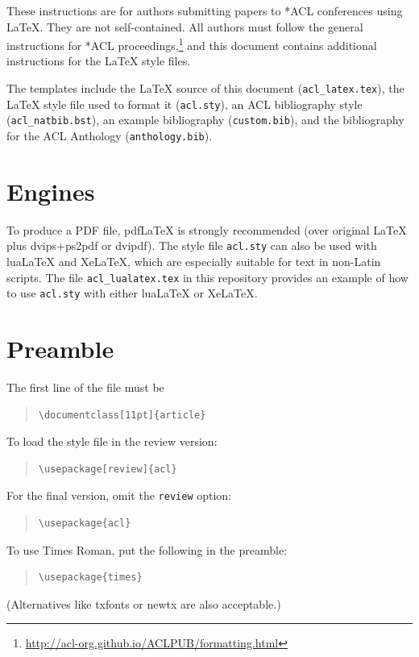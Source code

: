 \documentclass[11pt]{article}
\begin{document}
These instructions are for authors submitting papers to *ACL conferences using \LaTeX. They are not self-contained. All authors must follow the general instructions for *ACL proceedings,\footnote{\url{http://acl-org.github.io/ACLPUB/formatting.html}} and this document contains additional instructions for the \LaTeX{} style files.

The templates include the \LaTeX{} source of this document (\texttt{acl\_latex.tex}),
the \LaTeX{} style file used to format it (\texttt{acl.sty}),
an ACL bibliography style (\texttt{acl\_natbib.bst}),
an example bibliography (\texttt{custom.bib}),
and the bibliography for the ACL Anthology (\texttt{anthology.bib}).

\section{Engines}

To produce a PDF file, pdf\LaTeX{} is strongly recommended (over original \LaTeX{} plus dvips+ps2pdf or dvipdf).
The style file \texttt{acl.sty} can also be used with
lua\LaTeX{} and
Xe\LaTeX{}, which are especially suitable for text in non-Latin scripts.
The file \texttt{acl\_lualatex.tex} in this repository provides
an example of how to use \texttt{acl.sty} with either
lua\LaTeX{} or
Xe\LaTeX{}.

\section{Preamble}

The first line of the file must be
\begin{quote}
\begin{verbatim}
\documentclass[11pt]{article}
\end{verbatim}
\end{quote}

To load the style file in the review version:
\begin{quote}
\begin{verbatim}
\usepackage[review]{acl}
\end{verbatim}
\end{quote}
For the final version, omit the \verb|review| option:
\begin{quote}
\begin{verbatim}
\usepackage{acl}
\end{verbatim}
\end{quote}

To use Times Roman, put the following in the preamble:
\begin{quote}
\begin{verbatim}
\usepackage{times}
\end{verbatim}
\end{quote}
(Alternatives like txfonts or newtx are also acceptable.)
\end{document}
